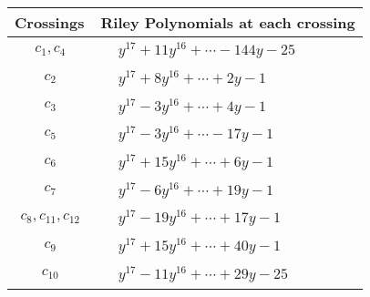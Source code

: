 \documentclass[1p]{elsarticle_modified}
\theoremstyle{definition}
\begin{document}
\begin{tabular}{m{50pt}|m{274pt}}
Crossings & \hspace{64pt}Riley Polynomials at each crossing \\
\hline $$\begin{aligned}c_{1},c_{4}\end{aligned}$$&$\begin{aligned}
&y^{17}+11 y^{16}+\cdots-144 y-25
\end{aligned}$\\
\hline $$\begin{aligned}c_{2}\end{aligned}$$&$\begin{aligned}
&y^{17}+8 y^{16}+\cdots+2 y-1
\end{aligned}$\\
\hline $$\begin{aligned}c_{3}\end{aligned}$$&$\begin{aligned}
&y^{17}-3 y^{16}+\cdots+4 y-1
\end{aligned}$\\
\hline $$\begin{aligned}c_{5}\end{aligned}$$&$\begin{aligned}
&y^{17}-3 y^{16}+\cdots-17 y-1
\end{aligned}$\\
\hline $$\begin{aligned}c_{6}\end{aligned}$$&$\begin{aligned}
&y^{17}+15 y^{16}+\cdots+6 y-1
\end{aligned}$\\
\hline $$\begin{aligned}c_{7}\end{aligned}$$&$\begin{aligned}
&y^{17}-6 y^{16}+\cdots+19 y-1
\end{aligned}$\\
\hline $$\begin{aligned}c_{8},c_{11},c_{12}\end{aligned}$$&$\begin{aligned}
&y^{17}-19 y^{16}+\cdots+17 y-1
\end{aligned}$\\
\hline $$\begin{aligned}c_{9}\end{aligned}$$&$\begin{aligned}
&y^{17}+15 y^{16}+\cdots+40 y-1
\end{aligned}$\\
\hline $$\begin{aligned}c_{10}\end{aligned}$$&$\begin{aligned}
&y^{17}-11 y^{16}+\cdots+29 y-25
\end{aligned}$\\
\hline
\end{tabular}\\~\\
\end{document}
